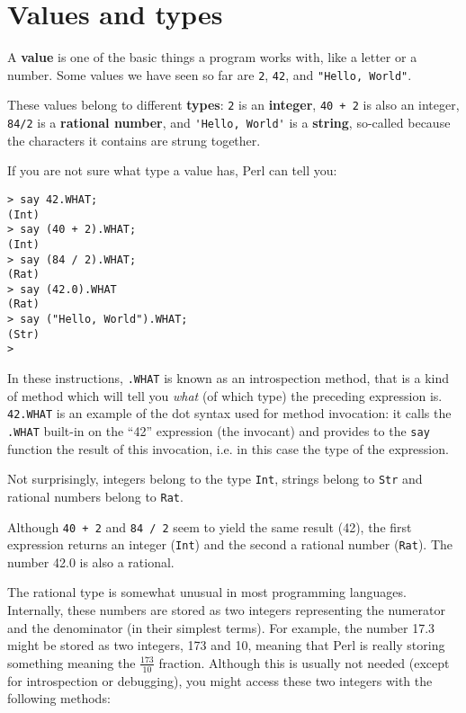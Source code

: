\section{Values and types}

A {\bf value} is one of the basic things a program works with, like a
letter or a number.  Some values we have seen so far are {\tt 2},
{\tt 42}, and \verb'"Hello, World"'.

These values belong to different {\bf types}:
{\tt 2} is an {\bf integer}, {\tt 40 + 2} is also an integer, 
{\tt 84/2} is a {\bf rational number},
and \verb"'Hello, World'" is a {\bf string}, so-called 
because the characters it contains are strung together.

If you are not sure what type a value has, Perl can
tell you:

\begin{verbatim}
> say 42.WHAT;
(Int)
> say (40 + 2).WHAT;
(Int)
> say (84 / 2).WHAT;
(Rat)
> say (42.0).WHAT
(Rat)
> say ("Hello, World").WHAT;
(Str)
>
\end{verbatim}
%
In these instructions, {\tt .WHAT} is known as an 
introspection method, that is a kind of method which 
will tell you \emph{what} (of  which type) the preceding 
expression is. {\tt 42.WHAT} is an example of the dot 
syntax used for method invocation: it calls the {\tt .WHAT} 
built-in on the ``42'' expression (the invocant) and provides 
to the {\tt say} function the result of this invocation, 
i.e. in this case the type of the expression.

Not surprisingly, integers belong to the type {\tt Int},
strings belong to {\tt Str} and rational 
numbers belong to {\tt Rat}.  

Although {\tt 40 + 2} and {\tt 84 / 2} seem to yield the 
same result (42), the first expression returns an integer 
({\tt Int}) and the second a rational number ({\tt Rat}). 
The number 42.0 is also a rational.

The rational type is somewhat unusual in most programming 
languages. Internally, these numbers are stored as two 
integers representing the numerator and the denominator 
(in their simplest terms). For example, the number 17.3 
might be stored as two integers, 173 and 10, meaning that 
Perl is really storing something meaning the $\frac{173}{10}$ 
fraction. Although this is usually not needed (except 
for introspection or debugging), you might access these 
two integers with the following methods:

